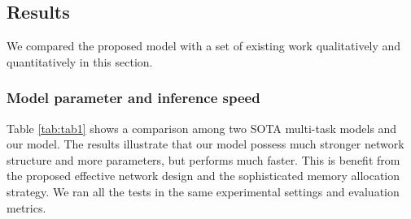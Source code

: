 \documentclass[10pt,twocolumn,letterpaper]{article}
\begin{document}
\subsection{Results}
We compared the proposed model with a set of existing work qualitatively and quantitatively in this section.

\subsubsection{Model parameter and inference speed}
Table \ref{tab:tab1} shows a comparison among two SOTA multi-task models and our model. The results illustrate that our model possess much stronger network structure and more parameters, but performs much faster. This is benefit from the proposed effective network design and the sophisticated memory allocation strategy. We ran all the tests in the same experimental settings and evaluation metrics.


\begin{table}[htbp]
    \footnotesize
    \begin{center}
    \end{center}
    \caption{Comparison of model parameter and inference speed.}
    \label{tab:tab1}
\end{table}
\end{document}
